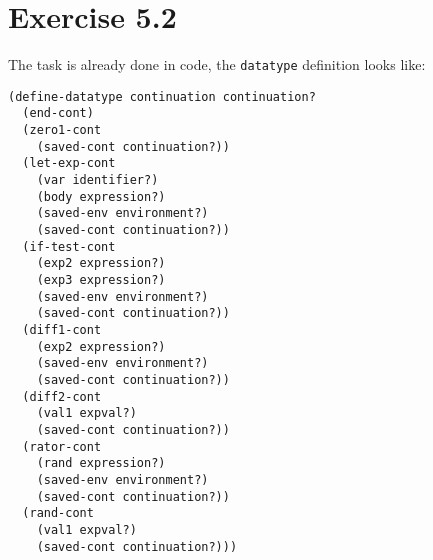 \section{Exercise 5.2}

The task is already done in code, the \texttt{datatype}
definition looks like:

\begin{verbatim}
(define-datatype continuation continuation?
  (end-cont)                 
  (zero1-cont
    (saved-cont continuation?))
  (let-exp-cont
    (var identifier?)
    (body expression?)
    (saved-env environment?)
    (saved-cont continuation?))
  (if-test-cont 
    (exp2 expression?)
    (exp3 expression?)
    (saved-env environment?)
    (saved-cont continuation?))
  (diff1-cont                
    (exp2 expression?)
    (saved-env environment?)
    (saved-cont continuation?))
  (diff2-cont                
    (val1 expval?)
    (saved-cont continuation?))
  (rator-cont            
    (rand expression?)
    (saved-env environment?)
    (saved-cont continuation?))
  (rand-cont             
    (val1 expval?)
    (saved-cont continuation?)))
\end{verbatim}
